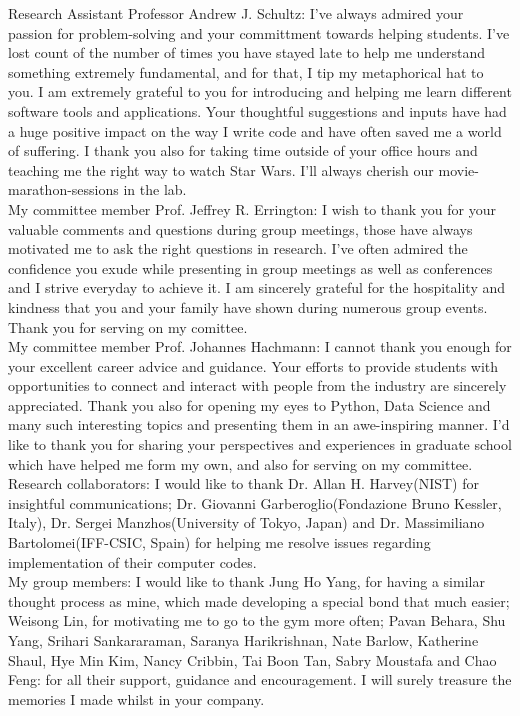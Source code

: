 \noindent Research Assistant Professor Andrew J. Schultz: I've always admired your passion for problem-solving and your committment towards helping students. I've lost count of the number of times you have stayed late to help me understand something extremely fundamental, and for that, I tip my metaphorical hat to you. I am extremely grateful to you for introducing and helping me learn different software tools and applications. Your thoughtful suggestions and inputs have had a huge positive impact on the way I write code and have often saved me a world of suffering. I thank you also for taking time outside of your office hours and teaching me the right way to watch Star Wars. I'll always cherish our movie-marathon-sessions in the lab.\\

\noindent My committee member Prof. Jeffrey R. Errington: I wish to thank you for your valuable comments and questions during group meetings, those have always motivated me to ask the right questions in research. I've often admired the confidence you exude while presenting in group meetings as well as conferences and I strive everyday to achieve it. I am sincerely grateful for the hospitality and kindness that you and your family have shown during numerous group events.  Thank you for serving on my comittee.\\

\noindent My committee member Prof. Johannes Hachmann: I cannot thank you enough for your excellent career advice and guidance. Your efforts to provide students with opportunities to connect and interact with people from the industry are sincerely appreciated. Thank you also for opening my eyes to Python, Data Science and many such interesting topics and presenting them in an awe-inspiring manner. I'd like to thank you for sharing your perspectives and experiences in graduate school which have helped me form my own, and also for serving on my committee.\\

\noindent Research collaborators: I would like to thank Dr. Allan H. Harvey(NIST) for insightful communications; Dr. Giovanni Garberoglio(Fondazione Bruno Kessler, Italy), Dr. Sergei Manzhos(University of Tokyo, Japan) and Dr. Massimiliano Bartolomei(IFF-CSIC, Spain) for helping me resolve issues regarding implementation of their computer codes.\\

\noindent My group members: I would like to thank Jung Ho Yang, for having a similar thought process as mine, which made developing a special bond that much easier; Weisong Lin, for motivating me to go to the gym more often; Pavan Behara, Shu Yang, Srihari Sankararaman, Saranya Harikrishnan, Nate Barlow, Katherine Shaul, Hye Min Kim, Nancy Cribbin, Tai Boon Tan, Sabry Moustafa and Chao Feng: for all their support, guidance and encouragement. I will surely treasure the memories I made whilst in your company.\\

